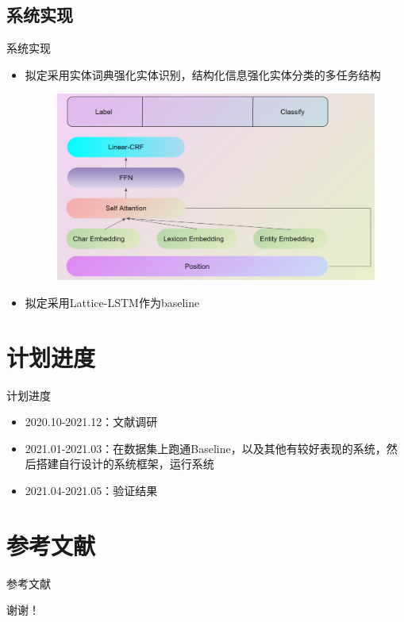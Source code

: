 \documentclass[notheorems, aspectratio=54, compress]{beamer}
\begin{document}
\subsection{系统实现}

\begin{frame}{系统实现}
  \begin{itemize}
    \item 拟定采用实体词典强化实体识别，结构化信息强化实体分类的多任务结构
    \begin{figure}
    	\centering
    	\includegraphics[width=0.8\linewidth,height=0.6\textheight,keepaspectratio]{系统框架}
    \end{figure}
    \item 拟定采用Lattice-LSTM\cite{zhang2018chinese}作为baseline
  \end{itemize}
\end{frame}
   

\section{计划进度}

\begin{frame}{计划进度}
  \begin{itemize}
    \item 2020.10-2021.12：文献调研
    \item 2021.01-2021.03：在数据集上跑通Baseline，以及其他有较好表现的系统，然后搭建自行设计的系统框架，运行系统
    \item 2021.04-2021.05：验证结果
  \end{itemize}
\end{frame}

\section{参考文献}

\begin{frame}[allowframebreaks]{参考文献}
  \tiny
  
\end{frame}

\begin{frame}
  \begin{center}
    \Huge 谢谢！
  \end{center}
\end{frame}
\end{document}
